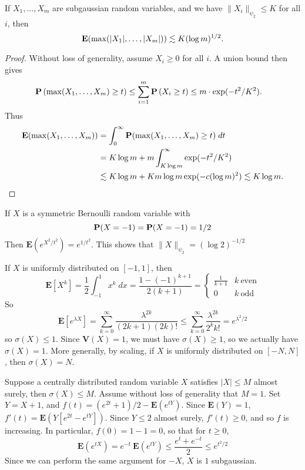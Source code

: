 \begin{theorem}
    If $X_1, \dots, X_m$ are subgaussian random variables, and we have $\| X_i \|_{\psi_2} \leq K$ for all $i$, then
    \[ \operatorname{\mathbf{E}}(\max(|X_1|,\dots,|X_m|)) \lesssim K (\log m)^{1/2}. \]
\end{theorem}
\begin{proof}
    Without loss of generality, assume $X_i \geq 0$ for all $i$. A union bound then gives
    \begin{align*}
        \mathbf{P} \left( \max(X_1, \dots, X_m) \geq t \right) &\leq \sum_{i = 1}^m \mathbf{P} \left( X_i \geq t \right) \leq m \cdot \exp(-t^2/K^2).
    \end{align*}
    Thus
    \begin{align*}
        \operatorname{\mathbf{E}}(\max(X_1, \dots, X_m)) &= \int_0^\infty \mathbf{P}(\max(X_1, \dots, X_m) \geq t )\; dt\\
        &= K \log m + m \int_{K \log m}^\infty \exp(-t^2/K^2)\\
        &\lesssim K \log m + Km \log m \exp(-c (\log m)^2) \lesssim K \log m. \qedhere
    \end{align*}
\end{proof}

\begin{example}
    If $X$ is a symmetric Bernoulli random variable with
    \[ \operatorname{\mathbf{P}}(X = -1) = \operatorname{\mathbf{P}}(X = -1) = 1/2 \]
    Then $\mathbf{E}(e^{X^2/t^2}) = e^{1/t^2}$. This shows that $\| X \|_{\psi_2} = (\log 2)^{-1/2}$
\end{example}

\begin{example}
    If $X$ is uniformly distributed on $[-1,1]$, then
    \[ \mathbf{E}[X^k] = \frac{1}{2} \int_{-1}^1 x^k\; dx = \frac{1 - (-1)^{k+1}}{2(k+1)} = \begin{cases} \frac{1}{k+1} & k\ \text{even} \\ 0 & k\ \text{odd} \end{cases} \]
    So
    \[ \mathbf{E}[e^{\lambda X}] = \sum_{k = 0}^\infty \frac{\lambda^{2k}}{(2k+1)(2k)!} \leq \sum_{k = 0}^\infty \frac{\lambda^{2k}}{2^k k!} = e^{\lambda^2/2} \]
    so $\sigma(X) \leq 1$. Since $\mathbf{V}(X) = 1$, we must have $\sigma(X) \geq 1$, so we actually have $\sigma(X) = 1$. More generally, by scaling, if $X$ is uniformly distributed on $[-N,N]$, then $\sigma(X) = N$.
\end{example}

\begin{example}
    Suppose a centrally distributed random variable $X$ satisfies $|X| \leq M$ almost surely, then $\sigma(X) \leq M$. Assume without loss of generality that $M = 1$. Set $Y = X+1$, and $f(t) = (e^{2t} + 1)/2 - \mathbf{E}(e^{tY})$. Since $\mathbf{E}(Y) = 1$, $f'(t) = \mathbf{E}(Y[e^{2t} - e^{tY}])$. Since $Y \leq 2$ almost surely, $f'(t) \geq 0$, and so $f$ is increasing. In particular, $f(0) = 1 - 1 = 0$, so that for $t \geq 0$,
    \[ \mathbf{E}(e^{tX}) = e^{-t}\ \mathbf{E}(e^{tY}) \leq \frac{e^{t} + e^{-t}}{2} \leq e^{t^2/2} \]
    Since we can perform the same argument for $-X$, $X$ is $1$ subgaussian.
\end{example}

